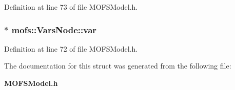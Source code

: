 Definition at line 73 of file M\-O\-F\-S\-Model.\-h.

\subsubsection[{var}]{$\ast$ mofs\-::\-Vars\-Node\-::var}\label{structmofs_1_1VarsNode_a39535d838bc14fb31992afcd2ad66e68}


Definition at line 72 of file M\-O\-F\-S\-Model.\-h.



The documentation for this struct was generated from the following file\-:\begin{DoxyCompactItemize}
\item 
{\bf M\-O\-F\-S\-Model.\-h}\end{DoxyCompactItemize}

